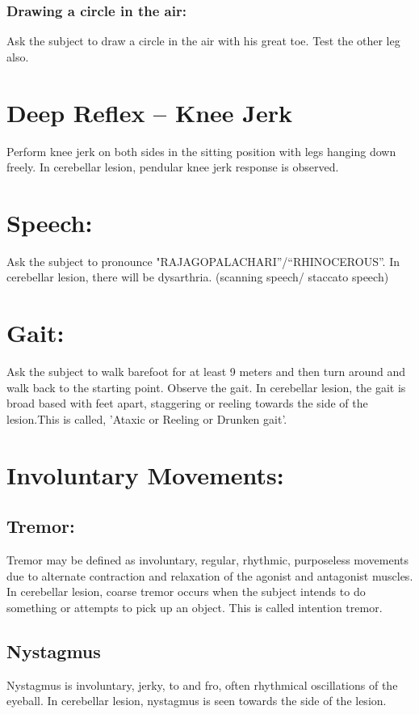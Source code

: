 \documentclass[a4paper,12pt,openany,oneside]{book}
\begin{document}
\subsubsection*{Drawing a circle in the air:}
				Ask the subject to draw a circle in the air with his great toe. Test the other leg  also.
				\section*{Deep Reflex – Knee Jerk}
					Perform knee jerk on both sides in the sitting position with legs hanging down freely.
						In cerebellar lesion, pendular knee jerk response is observed.

						\section*{Speech:}
						Ask the subject to pronounce "RAJAGOPALACHARI”/“RHINOCEROUS”.
							In cerebellar lesion, there will be dysarthria. (scanning speech/ staccato speech)
							\section*{Gait:}
								Ask the subject to walk barefoot for at least 9 meters and then turn around and walk back to the starting point. Observe the gait.
									In cerebellar lesion, the gait is broad based with feet apart, staggering or reeling towards the side of the lesion.This is called, 'Ataxic or Reeling or Drunken gait'.
								\section*{Involuntary Movements:} 
								\subsection*{Tremor:}
										Tremor may be defined as involuntary, regular, rhythmic, purposeless movements due to alternate contraction and relaxation of the agonist and antagonist muscles.
											In cerebellar lesion, coarse tremor occurs when the subject intends to do something or attempts to pick up an object. This is called intention tremor.
											\subsection*{Nystagmus}
											Nystagmus is involuntary, jerky, to and fro, often rhythmical oscillations of the eyeball. In cerebellar lesion, nystagmus is seen towards the side of the lesion.
\end{document}

